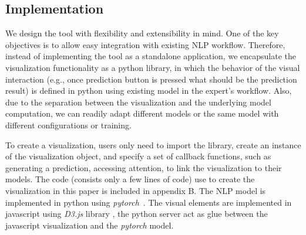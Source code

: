 \subsection{Implementation}
\label{sec:implementation}
We design the tool with flexibility and extensibility in mind. One of the key objectives is to allow easy integration with existing NLP workflow. Therefore, instead of implementing the tool as a standalone application, we encapsulate the visualization functionality as a python library, in which the behavior of the visual interaction (e.g., once prediction button is pressed what should be the prediction result) is defined in python using existing model in the expert's workflow. Also, due to the separation between the visualization and the underlying model computation, we can readily adapt different models or the same model with different configurations or training. 

To create a visualization, users only need to import the library, create an instance of the visualization object, and specify a set of callback functions, such as generating a prediction, accessing attention, to link the visualization to their models. The code (consists only a few lines of code) use to create the visualization in this paper is included in appendix B.
%
The NLP model is implemented in python using \emph{pytorch}~\cite{PaszkeGrossChintala2017}.
The visual elements are implemented in javascript using \emph{D3.js} library , the python server act as glue between the javascript visualization and the \emph{pytorch} model.
